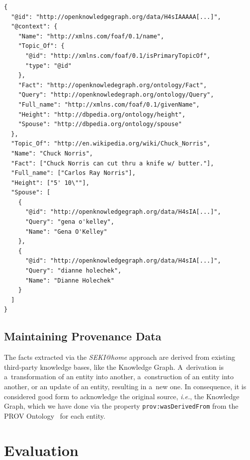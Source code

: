 \documentclass[runningheads,a4paper]{llncs}
\begin{document}
\begin{lstlisting}[caption=Subset of the meaningful JSON-LD from the Chuck Norris Knowledge Graph data. The mapping of the Knowledge Graph terms can be seen in the @context., label=code:jsonld, float=hbt!, escapechar=§]
{
  "@id": "http://openknowledgegraph.org/data/H4sIAAAAA[...]",
  "@context": {
    "Name": "http://xmlns.com/foaf/0.1/name",
    "Topic_Of": {
      "@id": "http://xmlns.com/foaf/0.1/isPrimaryTopicOf",
      "type": "@id"
    },
    "Fact": "http://openknowledegraph.org/ontology/Fact",
    "Query": "http://openknowledegraph.org/ontology/Query",
    "Full_name": "http://xmlns.com/foaf/0.1/givenName",
    "Height": "http://dbpedia.org/ontology/height",
    "Spouse": "http://dbpedia.org/ontology/spouse"
  },
  "Topic_Of": "http://en.wikipedia.org/wiki/Chuck_Norris",
  "Name": "Chuck Norris",
  "Fact": ["Chuck Norris can cut thru a knife w/ butter."],
  "Full_name": ["Carlos Ray Norris"],
  "Height": ["5' 10\""],
  "Spouse": [
    {
      "@id": "http://openknowledgegraph.org/data/H4sIA[...]",
      "Query": "gena o'kelley",
      "Name": "Gena O'Kelley"
    },
    {
      "@id": "http://openknowledgegraph.org/data/H4sIA[...]",
      "Query": "dianne holechek",
      "Name": "Dianne Holechek"
    }
  ]
}
\end{lstlisting} 

\subsection{Maintaining Provenance Data}
The facts extracted via the \emph{SEKI@home} approach
are derived from existing third-party knowledge bases, like the Knowledge Graph.
A~derivation is a~transformation of an entity into another,
a~construction of an entity into another, or an update of an entity,
resulting in a~new one.
In consequence, it is considered good form to acknowledge the original source,
\emph{i.e.}, the Knowledge Graph,
which we have done via the property \texttt{prov:wasDerivedFrom}
from the PROV Ontology~\cite{lebo2012} for each entity.

\section{Evaluation} \label{sec:evaluation}
\end{document}
